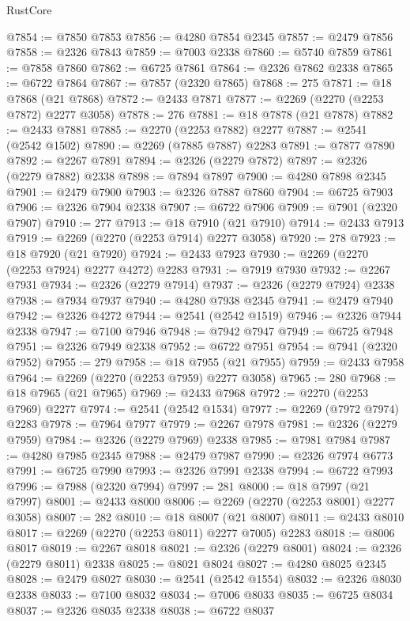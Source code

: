 \begin{lexlean}{RustCore}
\begin{coremodule}
@7854 := @7850 @7853
@7856 := @4280 @7854 @2345
@7857 := @2479 @7856
@7858 := @2326 @7843
@7859 := @7003 @2338
@7860 := @5740 @7859
@7861 := @7858 @7860
@7862 := @6725 @7861
@7864 := @2326 @7862 @2338
@7865 := @6722 @7864
@7867 := @7857 (@2320 @7865)
@7868 := 275
@7871 := @18 @7868 (@21 @7868)
@7872 := @2433 @7871
@7877 := @2269 (@2270 (@2253 @7872) @2277 @3058)
@7878 := 276
@7881 := @18 @7878 (@21 @7878)
@7882 := @2433 @7881
@7885 := @2270 (@2253 @7882) @2277
@7887 := @2541 (@2542 @1502)
@7890 := @2269 (@7885 @7887) @2283
@7891 := @7877 @7890
@7892 := @2267 @7891
@7894 := @2326 (@2279 @7872)
@7897 := @2326 (@2279 @7882) @2338
@7898 := @7894 @7897
@7900 := @4280 @7898 @2345
@7901 := @2479 @7900
@7903 := @2326 @7887 @7860
@7904 := @6725 @7903
@7906 := @2326 @7904 @2338
@7907 := @6722 @7906
@7909 := @7901 (@2320 @7907)
@7910 := 277
@7913 := @18 @7910 (@21 @7910)
@7914 := @2433 @7913
@7919 := @2269 (@2270 (@2253 @7914) @2277 @3058)
@7920 := 278
@7923 := @18 @7920 (@21 @7920)
@7924 := @2433 @7923
@7930 := @2269 (@2270 (@2253 @7924) @2277 @4272) @2283
@7931 := @7919 @7930
@7932 := @2267 @7931
@7934 := @2326 (@2279 @7914)
@7937 := @2326 (@2279 @7924) @2338
@7938 := @7934 @7937
@7940 := @4280 @7938 @2345
@7941 := @2479 @7940
@7942 := @2326 @4272
@7944 := @2541 (@2542 @1519)
@7946 := @2326 @7944 @2338
@7947 := @7100 @7946
@7948 := @7942 @7947
@7949 := @6725 @7948
@7951 := @2326 @7949 @2338
@7952 := @6722 @7951
@7954 := @7941 (@2320 @7952)
@7955 := 279
@7958 := @18 @7955 (@21 @7955)
@7959 := @2433 @7958
@7964 := @2269 (@2270 (@2253 @7959) @2277 @3058)
@7965 := 280
@7968 := @18 @7965 (@21 @7965)
@7969 := @2433 @7968
@7972 := @2270 (@2253 @7969) @2277
@7974 := @2541 (@2542 @1534)
@7977 := @2269 (@7972 @7974) @2283
@7978 := @7964 @7977
@7979 := @2267 @7978
@7981 := @2326 (@2279 @7959)
@7984 := @2326 (@2279 @7969) @2338
@7985 := @7981 @7984
@7987 := @4280 @7985 @2345
@7988 := @2479 @7987
@7990 := @2326 @7974 @6773
@7991 := @6725 @7990
@7993 := @2326 @7991 @2338
@7994 := @6722 @7993
@7996 := @7988 (@2320 @7994)
@7997 := 281
@8000 := @18 @7997 (@21 @7997)
@8001 := @2433 @8000
@8006 := @2269 (@2270 (@2253 @8001) @2277 @3058)
@8007 := 282
@8010 := @18 @8007 (@21 @8007)
@8011 := @2433 @8010
@8017 := @2269 (@2270 (@2253 @8011) @2277 @7005) @2283
@8018 := @8006 @8017
@8019 := @2267 @8018
@8021 := @2326 (@2279 @8001)
@8024 := @2326 (@2279 @8011) @2338
@8025 := @8021 @8024
@8027 := @4280 @8025 @2345
@8028 := @2479 @8027
@8030 := @2541 (@2542 @1554)
@8032 := @2326 @8030 @2338
@8033 := @7100 @8032
@8034 := @7006 @8033
@8035 := @6725 @8034
@8037 := @2326 @8035 @2338
@8038 := @6722 @8037

\end{coremodule}
\end{lexlean}
